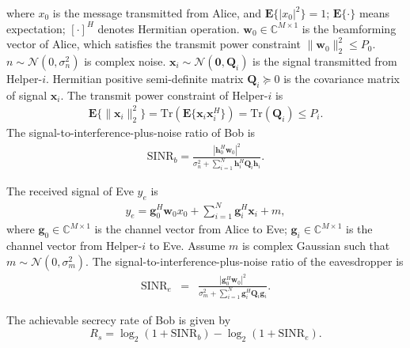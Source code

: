 \documentclass[journal]{IEEEtran}
\begin{document}
where $x_0$ is the message transmitted from Alice, and $\mathbf{E}\{|x_0|^2\} = 1$; $\mathbf{E}\{\cdot\}$ means expectation; $[\cdot]^H$ denotes Hermitian operation. $\mathbf{w}_{0} \in \mathbb{C}^{M \times 1}$  is the beamforming vector of Alice, which satisfies the transmit power constraint $\|\mathbf{w}_0\|_2^2 \leq P_0$. $n \sim \mathcal{N}(0,\sigma_n^2)$ is complex noise. $\mathbf{x}_i \sim \mathcal{N}(\mathbf{0}, \mathbf{Q}_i)$ is the signal transmitted from Helper-$i$. Hermitian positive semi-definite  matrix $\mathbf{Q}_i \succeq 0$ is the covariance matrix of signal $\mathbf
{x}_i$. The transmit power constraint of Helper-$i$ is 
\begin{eqnarray}
\mathbf{E}\{\|\mathbf{x}_i\|_2^2\}  = \mathrm{Tr}(\mathbf{E}\{\mathbf{x}_i\mathbf{x}_i^H\} )= \mathrm{Tr}(\mathbf{Q}_i) \leq P_i.
\end{eqnarray}
The signal-to-interference-plus-noise ratio of Bob is
\begin{eqnarray} \label{eq:SINR of Bob}
\mathrm{SINR}_b = \frac{\left| \mathbf{h}_{0}^H\mathbf{w}_{0}\right|^2}{\sigma_n^2 + \sum_{i=1}^{N}\mathbf{h}_{i}^H\mathbf{Q}_{i}\mathbf{h}_i}.
\end{eqnarray}

The received signal of Eve $y_e$ is
\begin{eqnarray}
y_e = \mathbf{g}_0^H\mathbf{w}_0x_0 + \sum_{i = 1}^N\mathbf{g}_i^H\mathbf{x}_i + m,
\end{eqnarray}
where $\mathbf{g}_0 \in \mathbb{C}^{M \times 1}$ is the channel vector from Alice to Eve; $\mathbf{g}_i \in \mathbb{C}^{M \times 1}$ is the channel vector from Helper-$i$ to Eve.   Assume $m$ is complex Gaussian such that $m \sim \mathcal{N}(0,\sigma_m^2)$.
The signal-to-interference-plus-noise ratio of the eavesdropper is
\begin{eqnarray}
\mathrm{SINR}_e &=& \frac{\left| \mathbf{g}_{0}^H\mathbf{w}_{0}\right|^2}{\sigma_m^2 + \sum_{i=1}^{N}\mathbf{g}_{i}^H\mathbf{Q}_{i}\mathbf{g}_i} \label{eq:secure_capacity}.
\end{eqnarray}

The achievable secrecy rate of Bob is given by \cite{6728676}
\begin{equation}
R_s = \log_2\left(1 + \mathrm{SINR}_b\right)-\log_2\left(1 + \mathrm{SINR}_e\right).
\end{equation}
\end{document}
